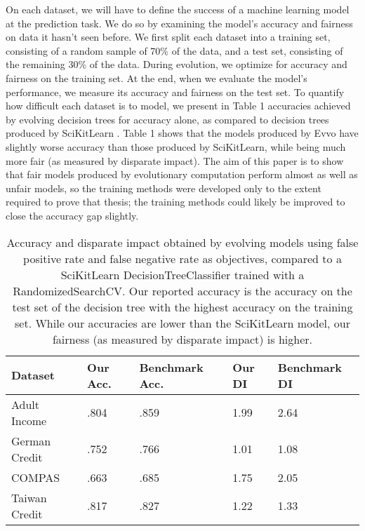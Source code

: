 \documentclass[10pt]{acmart}
\begin{document}
On each dataset, we will have to define the success of a machine learning model at the prediction task. We do so by examining the model’s accuracy and fairness on data it hasn’t seen before. We first split each dataset into a training set, consisting of a random sample of 70\% of the data, and a test set, consisting of the remaining 30\% of the data. During evolution, we optimize for accuracy and fairness on the training set. At the end, when we evaluate the model’s performance, we measure its accuracy and fairness on the test set. To quantify how difficult each dataset is to model, we present in Table 1 accuracies achieved by evolving decision trees for accuracy alone, as compared to decision trees produced by SciKitLearn \citep{scikit-learn}. Table 1 shows that the models produced by Evvo have slightly worse accuracy than those produced by SciKitLearn, while being much more fair (as measured by disparate impact). The aim of this paper is to show that fair models produced by evolutionary computation perform almost as well as unfair models, so the training methods were developed only to the extent required to prove that thesis; the training methods could likely be improved to close the accuracy gap slightly.

\renewcommand{\arraystretch}{1.5}
\begin{table}
	\begin{center}
	\begin{tabular}{| l | l | l | l | l |}
	\hline Dataset & Our Acc. & Benchmark Acc. & Our DI & Benchmark DI
	\\ \hline Adult Income  & .804 & .859 & 1.99 & 2.64
	\\ \hline German Credit & .752 & .766 & 1.01 & 1.08
	\\ \hline COMPAS        & .663 & .685 & 1.75 & 2.05
	\\ \hline Taiwan Credit & .817 & .827 & 1.22 & 1.33
	\\ \hline
	\end{tabular}
	\end{center}
    \caption{Accuracy and disparate impact obtained by evolving models using false positive rate and false negative rate as objectives, compared to a SciKitLearn DecisionTreeClassifier trained with a RandomizedSearchCV. Our reported accuracy is the accuracy on the test set of the decision tree with the highest accuracy on the training set. While our accuracies are lower than the SciKitLearn model, our fairness (as measured by disparate impact) is higher.}
\end{table}
\end{document}
